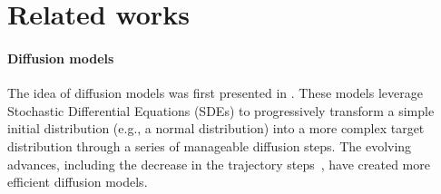 \section{Related works}
\paragraph{Diffusion models}

The idea of diffusion models was first presented in \cite{sohl2015deep}. These models leverage Stochastic Differential Equations (SDEs) to progressively transform a simple initial distribution (e.g., a normal distribution) into a more complex target distribution through a series of manageable diffusion steps. The evolving advances, including the decrease in the trajectory steps~\cite{bordes2017learning}, have created more efficient diffusion models.

